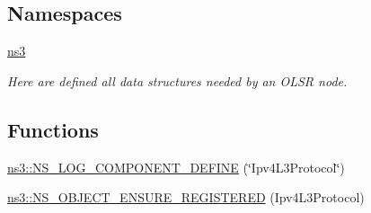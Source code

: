 \subsection*{Namespaces}
\begin{DoxyCompactItemize}
\item 
 \hyperlink{namespacens3}{ns3}
\begin{DoxyCompactList}\small\item\em Here are defined all data structures needed by an O\+L\+SR node. \end{DoxyCompactList}\end{DoxyCompactItemize}
\subsection*{Functions}
\begin{DoxyCompactItemize}
\item 
\hyperlink{namespacens3_aa36f8112a582416407545bfde2f91d72}{ns3\+::\+N\+S\+\_\+\+L\+O\+G\+\_\+\+C\+O\+M\+P\+O\+N\+E\+N\+T\+\_\+\+D\+E\+F\+I\+NE} (\char`\"{}Ipv4\+L3\+Protocol\char`\"{})
\item 
\hyperlink{namespacens3_afa1346c80aa5357bc5a62669d2746ed4}{ns3\+::\+N\+S\+\_\+\+O\+B\+J\+E\+C\+T\+\_\+\+E\+N\+S\+U\+R\+E\+\_\+\+R\+E\+G\+I\+S\+T\+E\+R\+ED} (Ipv4\+L3\+Protocol)
\end{DoxyCompactItemize}
